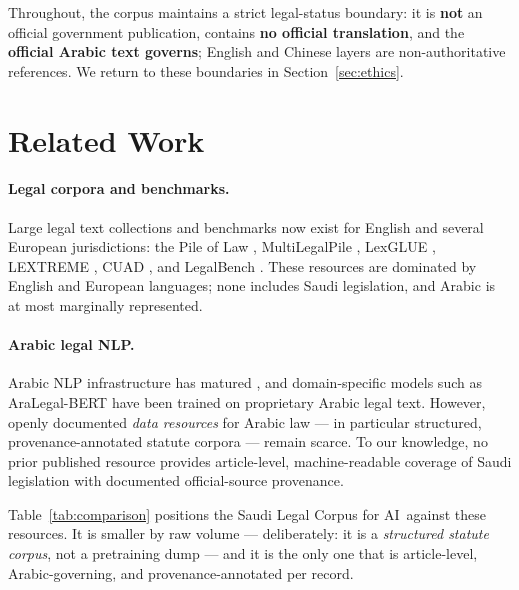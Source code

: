 \documentclass[11pt]{article}
\newcommand{\corpusname}{Saudi Legal Corpus for AI}
\begin{document}
Throughout, the corpus maintains a strict legal-status boundary: it is
\textbf{not} an official government publication, contains \textbf{no
official translation}, and the \textbf{official Arabic text governs};
English and Chinese layers are non-authoritative references. We return to
these boundaries in Section~\ref{sec:ethics}.

\section{Related Work}

\paragraph{Legal corpora and benchmarks.}
Large legal text collections and benchmarks now exist for English and
several European jurisdictions: the Pile of Law
\citep{henderson2022pileoflaw}, MultiLegalPile
\citep{niklaus2024multilegalpile}, LexGLUE \citep{chalkidis2022lexglue},
LEXTREME \citep{niklaus2023lextreme}, CUAD \citep{hendrycks2021cuad}, and
LegalBench \citep{guha2023legalbench}. These resources are dominated by
English and European languages; none includes Saudi legislation, and Arabic
is at most marginally represented.

\paragraph{Arabic legal NLP.}
Arabic NLP infrastructure has matured \citep[e.g.,][]{antoun2020arabert,
obeid2020camel}, and domain-specific models such as AraLegal-BERT
\citep{alqurishi2022aralegal} have been trained on proprietary Arabic legal
text. However, openly documented \emph{data resources} for Arabic law ---
in particular structured, provenance-annotated statute corpora --- remain
scarce. To our knowledge, no prior published resource provides
article-level, machine-readable coverage of Saudi legislation with
documented official-source provenance.

Table~\ref{tab:comparison} positions the \corpusname\ against these
resources. It is smaller by raw volume --- deliberately: it is a
\emph{structured statute corpus}, not a pretraining dump --- and it is the
only one that is article-level, Arabic-governing, and provenance-annotated
per record.
\end{document}
